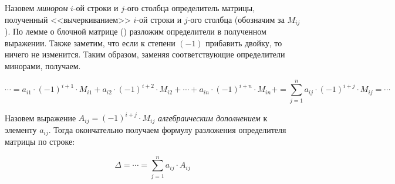 Назовем \emph{минором} $i$-ой строки и $j$-ого столбца определитель
матрицы, полученный <<вычеркиванием>> $i$-ой строки и $j$-ого столбца
(обозначим за $M_{ij}$). По лемме о блочной матрице
() разложим определители в полученном
выражении. Также заметим, что если к степени $(-1)$ прибавить двойку, то
ничего не изменится. Таким образом, заменяя соответствующие определители
минорами, получаем.

$$
\cdots=
a_{i1}\cdot(-1)^{i+1}\cdot M_{i1} +
a_{i2}\cdot(-1)^{i+2}\cdot M_{i2} +
\cdots                            +
a_{in}\cdot(-1)^{i+n}\cdot M_{in} +
=
\sum_{j=1}^n a_{ij}\cdot(-1)^{i+j}\cdot M_{ij}
=\cdots
$$

Назовем выражение $A_{ij}=(-1)^{i+j}\cdot M_{ij}$ \emph{алгебраическим
дополнением} к элементу $a_{ij}$. Тогда окончательно получаем формулу
разложения определителя матрицы по строке:

$$
\Delta = \cdots = \sum_{j=1}^n a_{ij}\cdot A_{ij}
$$



